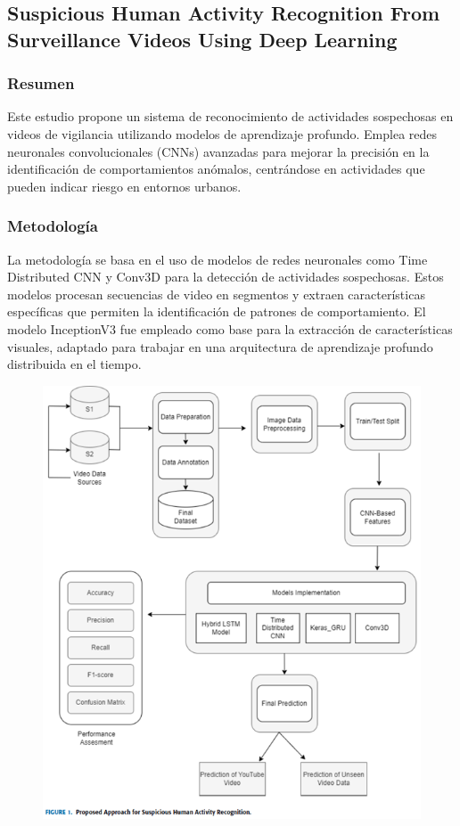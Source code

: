 \documentclass[listof=nochaptergap,12pt,times,authoryear]{report}
\begin{document}
\subsection{Suspicious Human Activity Recognition From Surveillance Videos Using Deep Learning}

\subsubsection{Resumen}
Este estudio propone un sistema de reconocimiento de actividades sospechosas en videos de vigilancia utilizando modelos de aprendizaje profundo. Emplea redes neuronales convolucionales (CNNs) avanzadas para mejorar la precisión en la identificación de comportamientos anómalos, centrándose en actividades que pueden indicar riesgo en entornos urbanos.

\subsubsection{Metodología}
La metodología se basa en el uso de modelos de redes neuronales como Time Distributed CNN y Conv3D para la detección de actividades sospechosas. Estos modelos procesan secuencias de video en segmentos y extraen características específicas que permiten la identificación de patrones de comportamiento. El modelo InceptionV3 fue empleado como base para la extracción de características visuales, adaptado para trabajar en una arquitectura de aprendizaje profundo distribuida en el tiempo.

\begin{figure}[h] %
    \centering
    \includegraphics[width=1.0\textwidth]{met7.png} %
    \label{fig:ejemplo} %
\end{figure}
\end{document}
